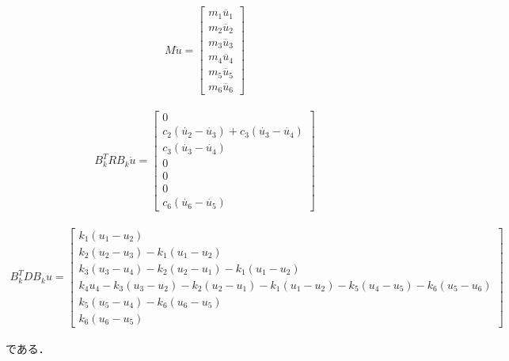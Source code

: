 \begin{eqnarray}
    M\ddot{u} =
    \left[\begin{matrix}
        m_1 \ddot{u_1} \\
        m_2 \ddot{u_2} \\
        m_3 \ddot{u_3} \\
        m_4 \ddot{u_4} \\
        m_5 \ddot{u_5} \\
        m_6 \ddot{u_6} 
    \end{matrix}\right]
\end{eqnarray}

\begin{eqnarray}
    B_k^T R B_k \dot{u} =
    \left[\begin{matrix}
        0 \\
        c_2 (\dot{u_2} - \dot{u_3}) + c_3 (\dot{u_3} - \dot{u_4}) \\
        c_3 (\dot{u_3} - \dot{u_4}) \\
        0 \\
        0 \\
        0 \\
        c_6 (\dot{u_6} - \dot{u_5}) 
    \end{matrix}\right]
\end{eqnarray}

\begin{eqnarray}
    B_k^T D B_k u =
    \left[\begin{matrix}
        k_1 (u_1 - u_2) \\
        k_2 (u_2 - u_3) - k_1 (u_1 - u_2) \\
        k_3 (u_3 - u_4) - k_2 (u_2 - u_1) - k_1 (u_1 - u_2) \\
        k_4 u_4 - k_3 (u_3 - u_2) - k_2 (u_2 - u_1) - k_1 (u_1 - u_2) - k_5 (u_4 - u_5) - k_6 (u_5 - u_6) \\
        k_5 (u_5 - u_4) - k_6 (u_6 - u_5) \\
        k_6 (u_6 - u_5) 
    \end{matrix}\right]
\end{eqnarray}

である．
